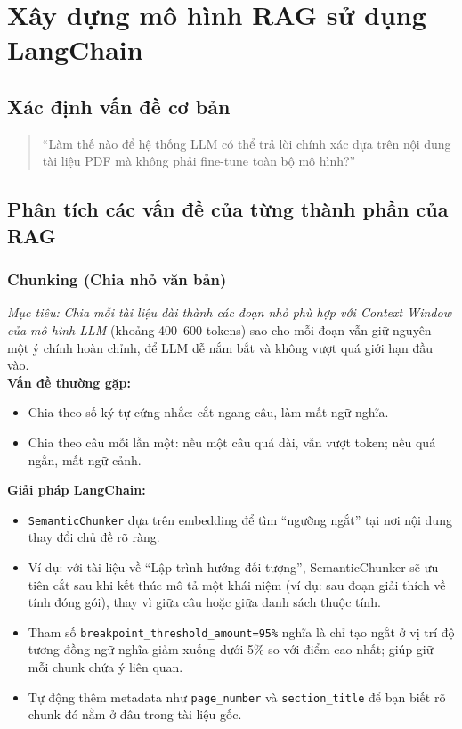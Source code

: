 \documentclass[11pt]{article}
\begin{document}
\section{Xây dựng mô hình RAG sử dụng LangChain}
\label{sec:build_rag}

\subsection{Xác định vấn đề cơ bản}
\begin{quote}
    “Làm thế nào để hệ thống LLM có thể trả lời chính xác dựa trên nội dung tài liệu PDF mà không phải fine-tune toàn bộ mô hình?”
\end{quote}

\subsection{Phân tích các vấn đề của từng thành phần của RAG}
\label{sec:principles_rag_improved}


\subsubsection{Chunking (Chia nhỏ văn bản)}

\textit{Mục tiêu:} \textit{Chia mỗi tài liệu dài thành các đoạn nhỏ phù hợp với Context Window của mô hình LLM} (khoảng 400–600 tokens) sao cho mỗi đoạn vẫn giữ nguyên một ý chính hoàn chỉnh, để LLM dễ nắm bắt và không vượt quá giới hạn đầu vào. \\


\noindent \textbf{Vấn đề thường gặp:}
\begin{itemize}
    \item Chia theo số ký tự cứng nhắc: cắt ngang câu, làm mất ngữ nghĩa.
    \item Chia theo câu mỗi lần một: nếu một câu quá dài, vẫn vượt token; nếu quá ngắn, mất ngữ cảnh.
\end{itemize}

\noindent \textbf{Giải pháp LangChain:}
\begin{itemize}
    \item \texttt{SemanticChunker} dựa trên embedding để tìm “ngưỡng ngắt” tại nơi nội dung thay đổi chủ đề rõ ràng.
    \item Ví dụ: với tài liệu về “Lập trình hướng đối tượng”, SemanticChunker sẽ ưu tiên cắt sau khi kết thúc mô tả một khái niệm (ví dụ: sau đoạn giải thích về tính đóng gói), thay vì giữa câu hoặc giữa danh sách thuộc tính.
    \item Tham số \texttt{breakpoint\_threshold\_amount=95\%} nghĩa là chỉ tạo ngắt ở vị trí độ tương đồng ngữ nghĩa giảm xuống dưới 5\% so với điểm cao nhất; giúp giữ mỗi chunk chứa ý liên quan.
    \item Tự động thêm metadata như \texttt{page\_number} và \texttt{section\_title} để bạn biết rõ chunk đó nằm ở đâu trong tài liệu gốc.
\end{itemize}
\end{document}
